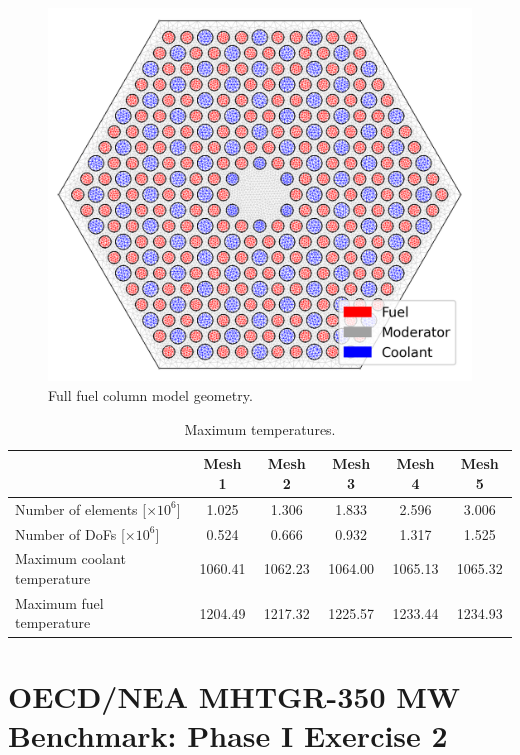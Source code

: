 \begin{figure}[htbp!]
  \centering
  \includegraphics[width=0.45\linewidth]{figures-thermal/full-assem-mesh2}
  \hfill
  \caption{Full fuel column model geometry.}
  \label{fig:th-full-assem-mesh}
\end{figure}

\begin{table}[htbp!]
  \centering
  \caption{Maximum temperatures.}
  \label{tab:th-full-assem-results}
\begin{tabular}{l|ccccc}
\toprule
                            & Mesh 1 & Mesh 2 & Mesh 3 & Mesh 4 & Mesh 5 \\
\midrule
Number of elements [$\times 10^{6}$]  & 1.025 & 1.306 & 1.833 & 2.596 & 3.006 \\
Number of DoFs [$\times 10^{6}$]      & 0.524 & 0.666 & 0.932 & 1.317 & 1.525 \\
Maximum coolant temperature & 1060.41 & 1062.23 & 1064.00 & 1065.13 & 1065.32 \\
Maximum fuel temperature    & 1204.49 & 1217.32 & 1225.57 & 1233.44 & 1234.93 \\
\bottomrule
\end{tabular}
\end{table}


\section{OECD/NEA MHTGR-350 MW Benchmark: Phase I Exercise 2}
\label{sec:ph1ex2}

